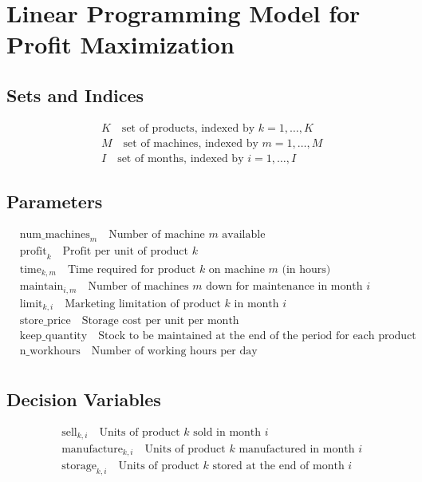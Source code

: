 \documentclass{article}
\begin{document}
\section*{Linear Programming Model for Profit Maximization}

\subsection*{Sets and Indices}
\begin{align*}
    &K \quad \text{set of products, indexed by } k = 1, \ldots, K\\
    &M \quad \text{set of machines, indexed by } m = 1, \ldots, M\\
    &I \quad \text{set of months, indexed by } i = 1, \ldots, I
\end{align*}

\subsection*{Parameters}
\begin{align*}
    &\text{num\_machines}_m \quad \text{Number of machine $m$ available}\\
    &\text{profit}_k \quad \text{Profit per unit of product $k$}\\
    &\text{time}_{k, m} \quad \text{Time required for product $k$ on machine $m$ (in hours)}\\
    &\text{maintain}_{i, m} \quad \text{Number of machines $m$ down for maintenance in month $i$}\\
    &\text{limit}_{k, i} \quad \text{Marketing limitation of product $k$ in month $i$}\\
    &\text{store\_price} \quad \text{Storage cost per unit per month}\\
    &\text{keep\_quantity} \quad \text{Stock to be maintained at the end of the period for each product}\\
    &\text{n\_workhours} \quad \text{Number of working hours per day}\\
\end{align*}

\subsection*{Decision Variables}
\begin{align*}
    &\text{sell}_{k, i} \quad \text{Units of product $k$ sold in month $i$}\\
    &\text{manufacture}_{k, i} \quad \text{Units of product $k$ manufactured in month $i$}\\
    &\text{storage}_{k, i} \quad \text{Units of product $k$ stored at the end of month $i$}
\end{align*}
\end{document}
